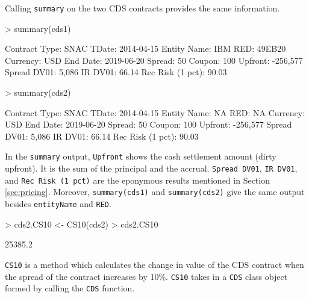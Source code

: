 \documentclass[a4paper]{article}
\begin{document}
Calling \texttt{summary} on the two CDS contracts provides the same information.

\begin{Schunk}
\begin{Sinput}
> summary(cds1)
\end{Sinput}
\begin{Soutput}
Contract Type:                      SNAC   TDate:                     2014-04-15
Entity Name:                         IBM   RED:                           49EB20
Currency:                            USD   End Date:                  2019-06-20
Spread:                               50   Coupon:                           100
Upfront:                        -256,577   Spread DV01:                    5,086
IR DV01:                           66.14   Rec Risk (1 pct):               90.03
\end{Soutput}
\begin{Sinput}
> summary(cds2)
\end{Sinput}
\begin{Soutput}
Contract Type:                      SNAC   TDate:                     2014-04-15
Entity Name:                          NA   RED:                               NA
Currency:                            USD   End Date:                  2019-06-20
Spread:                               50   Coupon:                           100
Upfront:                        -256,577   Spread DV01:                    5,086
IR DV01:                           66.14   Rec Risk (1 pct):               90.03
\end{Soutput}
\end{Schunk}

In the \texttt{summary} output, \texttt{Upfront} shows the cash
settlement amount (dirty upfront). It is the sum of the principal and
the accrual. \texttt{Spread DV01}, \texttt{IR DV01}, and \texttt{Rec
  Risk (1 pct)} are the eponymous results mentioned in Section
\ref{sec:pricing}. Moreover, \texttt{summary(cds1)} and
\texttt{summary(cds2)} give the same output besides
\texttt{entityName} and \texttt{RED}. 

\begin{Schunk}
\begin{Sinput}
> cds2.CS10 <- CS10(cds2)
> cds2.CS10
\end{Sinput}
\begin{Soutput}
[1] 25385.2
\end{Soutput}
\end{Schunk}

\texttt{CS10} is a method which calculates the change in value of the
CDS contract when the spread of the contract increases by
10\%. \texttt{CS10} takes in a \texttt{CDS} class object formed by
calling the \texttt{CDS} function.
\end{document}
